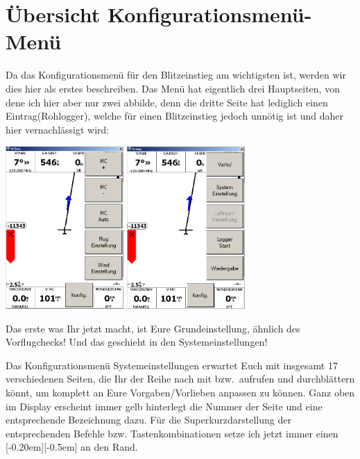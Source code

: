 \section{Übersicht Konfigurationsmenü-Menü}\label{Blitz-Konfig}
Da das Konfigurationsmenü für den Blitzeinstieg am wichtigsten ist, werden wir dies hier als erstes beschreiben. Das Menü hat eigentlich drei Hauptseiten, von dene ich hier aber nur zwei abbilde, denn die dritte Seite hat lediglich einen Eintrag(\textsf{Rohlogger}), welche für einen Blitzeinstieg jedoch unnötig ist und daher hier vernachlässigt wird:
\begin{center}
\includegraphics[width=4.5cm]{Bilder/HauptmenueKonfig1.png}%
\qquad\qquad\includegraphics[width=4.5cm]{Bilder/HauptmenueKonfig2.png}
\end{center}

Das erste was Ihr jetzt macht, ist Eure Grundeinstellung, ähnlich des Vorflugchecks! Und das geschieht in den \textsf{Systemeinstellungen}!

Das Konfigurationsmenü \textsf{ Systemeinstellungen} erwartet Euch mit insgesamt 17 verschiedenen Seiten, die Ihr der Reihe nach mit \fal bzw.\ \far aufrufen und durchblättern könnt, um  \xc komplett an Eure Vorgaben/Vorlieben anpassen zu können. Ganz oben im Display erscheint immer gelb hinterlegt die Nummer der Seite und eine entsprechende Bezeichnung dazu. Für die Superkurzdarstellung der entsprechenden Befehle bzw. Tastenkombinationen setze ich jetzt immer einen \raisebox{0mm}[-0.20em][-0.5em]{\smallblitz} an den Rand.\\

